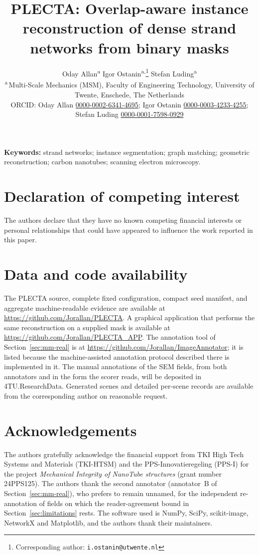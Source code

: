 \documentclass[11pt,a4paper]{article}
\title{\vspace{-1.2cm}\bfseries PLECTA: Overlap-aware instance
reconstruction of dense strand networks from binary masks}
\author{%
  \begin{minipage}{0.94\textwidth}
  \centering
  Oday Allan\textsuperscript{a}\quad
  Igor Ostanin\textsuperscript{a,}\thanks{Corresponding author:
  \texttt{i.ostanin@utwente.nl}}\quad
  Stefan Luding\textsuperscript{a}\\[5pt]
  {\small\textsuperscript{a}\,Multi-Scale Mechanics (MSM), Faculty of Engineering
  Technology, University of Twente, Enschede, The Netherlands}\\[4pt]
  {\small ORCID: Oday Allan
  \href{https://orcid.org/0000-0002-6341-4695}{0000-0002-6341-4695};\quad
  Igor Ostanin
  \href{https://orcid.org/0000-0003-4233-4255}{0000-0003-4233-4255};\quad
  Stefan Luding
  \href{https://orcid.org/0000-0001-7598-0929}{0000-0001-7598-0929}}
  \end{minipage}
}
\date{}
\begin{document}
\maketitle


\begin{abstract}

\end{abstract}

\noindent\textbf{Keywords:} strand networks; instance segmentation;
graph matching; geometric reconstruction; carbon nanotubes; scanning electron
microscopy.







\section*{Declaration of competing interest}
The authors declare that they have no known competing financial interests or
personal relationships that could have appeared to influence the work reported
in this paper.

\section*{Data and code availability}
The PLECTA source, complete fixed configuration, compact seed manifest,
and aggregate machine-readable evidence are available at
\url{https://github.com/Jorallan/PLECTA}. A graphical application that
performs the same reconstruction on a supplied mask is available at
\url{https://github.com/Jorallan/PLECTA_APP}. The
annotation tool of Section~\ref{sec:mm-real} is at
\url{https://github.com/Jorallan/ImageAnnotator}; it is listed because the
machine-assisted annotation protocol described there is implemented in it.
The manual annotations of the
\PlectaRealFieldCountLower{} SEM fields, from both annotators and in the form
the scorer reads, will be deposited in 4TU.ResearchData. Generated scenes
and detailed per-scene records are available from the corresponding author
on reasonable request.

\section*{Acknowledgements}
The authors gratefully acknowledge the financial support from TKI High Tech
Systems and Materials (TKI-HTSM) and the PPS-Innovatieregeling (PPS-I) for the
project \emph{Mechanical Integrity of NanoTube structures} (grant number
24PPS125).
The authors thank the second annotator (annotator~B of
Section~\ref{sec:mm-real}), who prefers to remain unnamed, for the independent
re-annotation of \PlectaInterAnnotatorFieldCount{} fields on which the
reader-agreement bound in Section~\ref{sec:limitations} rests.
The software used is NumPy, SciPy, scikit-image, NetworkX and Matplotlib, and
the authors thank their maintainers.

\setlength{\bibsep}{0pt plus 0.3ex}
\renewcommand{\bibfont}{\footnotesize}


\end{document}
